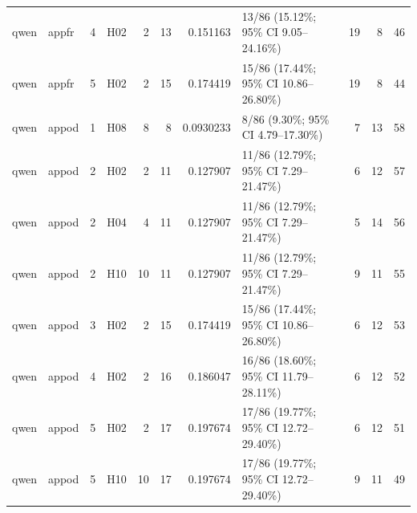 \begin{table}[tbp]
\begin{tabular}{llrlrrrlrrr}
qwen & appfr & 4 & H02 & 2 & 13 & 0.151163 & 13/86 (15.12\%; 95\% CI 9.05–24.16\%) & 19 & 8 & 46 \\
qwen & appfr & 5 & H02 & 2 & 15 & 0.174419 & 15/86 (17.44\%; 95\% CI 10.86–26.80\%) & 19 & 8 & 44 \\
qwen & appod & 1 & H08 & 8 & 8 & 0.0930233 & 8/86 (9.30\%; 95\% CI 4.79–17.30\%) & 7 & 13 & 58 \\
qwen & appod & 2 & H02 & 2 & 11 & 0.127907 & 11/86 (12.79\%; 95\% CI 7.29–21.47\%) & 6 & 12 & 57 \\
qwen & appod & 2 & H04 & 4 & 11 & 0.127907 & 11/86 (12.79\%; 95\% CI 7.29–21.47\%) & 5 & 14 & 56 \\
qwen & appod & 2 & H10 & 10 & 11 & 0.127907 & 11/86 (12.79\%; 95\% CI 7.29–21.47\%) & 9 & 11 & 55 \\
qwen & appod & 3 & H02 & 2 & 15 & 0.174419 & 15/86 (17.44\%; 95\% CI 10.86–26.80\%) & 6 & 12 & 53 \\
qwen & appod & 4 & H02 & 2 & 16 & 0.186047 & 16/86 (18.60\%; 95\% CI 11.79–28.11\%) & 6 & 12 & 52 \\
qwen & appod & 5 & H02 & 2 & 17 & 0.197674 & 17/86 (19.77\%; 95\% CI 12.72–29.40\%) & 6 & 12 & 51 \\
qwen & appod & 5 & H10 & 10 & 17 & 0.197674 & 17/86 (19.77\%; 95\% CI 12.72–29.40\%) & 9 & 11 & 49 \\
\bottomrule
\end{tabular}
\end{table}
